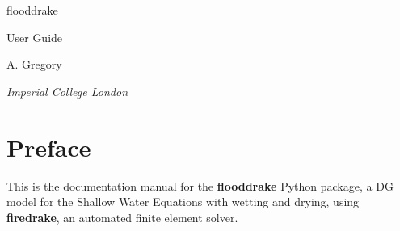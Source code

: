 \documentclass[10pt,letterpaper,extrafontsizes]{memoir}
\newcommand\svnidlong[4]{}
\begin{document}





\firmlists
\midsloppy
\raggedbottom
{}




\frontmatter
\pagestyle{empty}


\vspace*{\fill}
\begin{center}
\HUGE\textsf{flooddrake}\par
\end{center}
\bigskip
\begin{center}
\Huge\textsf{User Guide}\par
\end{center}
\bigskip
\begin{center}
\LARGE\textsf{A. Gregory}\par
\bigskip
\normalsize\textsf{\textit{Imperial College London}}\par
\medskip
\end{center}
\vspace*{\fill}
\def\THP{T\kern-0.2em H\kern-0.4em P}%
\def\THP{T\kern-0.15em H\kern-0.3em P}%

\clearpage




\cleardoublepage

\pagestyle{headings}

\clearpage
\tableofcontents
\setlength{\unitlength}{1pt}




\svnidlong
{$Ignore: $}
{$LastChangedDate: 2014-11-05 16:28:11 +0100 (Wed, 05 Nov 2014) $}
{$LastChangedRevision: 501 $}
{$LastChangedBy: daleif $}

\chapter{Preface}


    This is the documentation manual for the \textbf{flooddrake} Python package, a DG model for the Shallow Water Equations with wetting and drying, using \textbf{firedrake}, an automated finite element solver.\\
    
\end{document}
